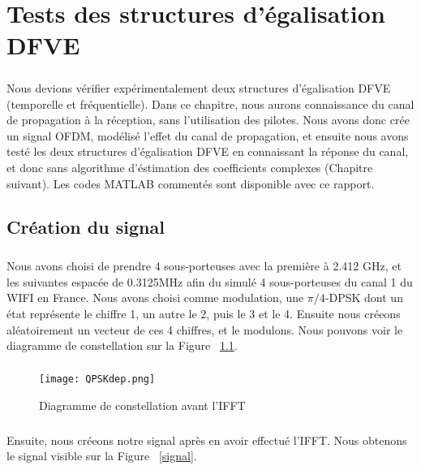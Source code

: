 \chapter{Tests des structures d'égalisation DFVE}

\paragraph{}
Nous devions vérifier expérimentalement deux structures d'égalisation DFVE (temporelle et fréquentielle). Dans ce chapitre, nous aurons connaissance du canal de propagation à la réception, sans l'utilisation des pilotes. Nous avons donc crée un signal OFDM, modélisé l'effet du canal de propagation, et ensuite nous avons testé les deux structures d'égalisation DFVE en connaissant la réponse du canal, et donc sans algorithme d'éstimation des coefficients complexes (Chapitre suivant). Les codes MATLAB commentés sont disponible avec ce rapport.

\section{Création du signal}

\paragraph{}
Nous avons choisi de prendre 4 sous-porteuses avec la première à 2.412 GHz, et les suivantes espacée de 0.3125MHz afin du simulé 4 sous-porteuses du canal 1 du WIFI en France. Nous avons choisi comme modulation, une $\pi/4$-DPSK dont un état représente le chiffre 1, un autre le 2, puis le 3 et le 4. Ensuite nous créeons aléatoirement un vecteur de ces 4 chiffres, et le modulons. Nous pouvons voir le diagramme de constellation sur la Figure ~\ref{QPSK}.

\paragraph{}
\vspace{1\baselineskip}
\begin{figure}[!h]
  \centering
  \texttt{[image: QPSKdep.png]}
  \caption{Diagramme de constellation avant l'IFFT }
	\label{QPSK} 
\end{figure}
\vspace{10\baselineskip}

\paragraph{}
Ensuite, nous créeons notre signal après en avoir effectué l'IFFT. Nous obtenons le signal visible sur la Figure ~\ref{signal}.

